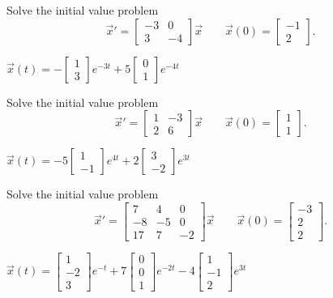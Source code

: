 \begin{exercise}
Solve the initial value problem
\[ {\vec{x}}' = \begin{bmatrix} -3 & 0 \\ 3 & -4 \end{bmatrix} \vec{x} \qquad \vec{x}(0) = \begin{bmatrix} -1 \\ 2 \end{bmatrix}. \]
\end{exercise}
\comboSol{%
}
{%
$\vec{x}(t) = -\left[\begin{smallmatrix} 1 \\ 3 \end{smallmatrix}\right]e^{-3t} + 5\left[\begin{smallmatrix} 0 \\ 1 \end{smallmatrix}\right]e^{-4t}$
}

\begin{exercise}
Solve the initial value problem
\[ {\vec{x}}' = \begin{bmatrix} 1 & -3 \\ 2 & 6 \end{bmatrix} \vec{x} \qquad \vec{x}(0) = \begin{bmatrix} 1 \\ 1 \end{bmatrix}. \]
\end{exercise}
\comboSol{%
}
{%
$\vec{x}(t) = -5\left[\begin{smallmatrix} 1 \\ -1 \end{smallmatrix}\right]e^{4t} + 2\left[\begin{smallmatrix} 3 \\ -2 \end{smallmatrix}\right]e^{3t}$
}

\begin{exercise}
Solve the initial value problem
\[ {\vec{x}}' = \begin{bmatrix} 7 & 4 & 0 \\ -8 & -5 & 0 \\ 17 & 7 & -2 \end{bmatrix} \vec{x} \qquad \vec{x}(0) = \begin{bmatrix} -3 \\ 2 \\ 2 \end{bmatrix}. \]
\end{exercise}
\comboSol{%
}
{%
$\vec{x}(t) = \left[\begin{smallmatrix} 1 \\ -2 \\ 3 \end{smallmatrix}\right]e^{-t} + 7\left[\begin{smallmatrix} 0 \\ 0 \\ 1 \end{smallmatrix}\right]e^{-2t} - 4\left[\begin{smallmatrix} 1 \\ -1 \\ 2 \end{smallmatrix}\right]e^{3t}$
}


\setcounter{exercise}{100}













